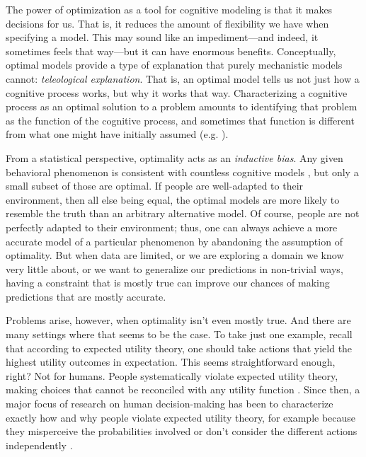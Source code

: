 The power of optimization as a tool for cognitive modeling is that it makes decisions for us. That is, it reduces the amount of flexibility we have when specifying a model. This may sound like an impediment---and indeed, it sometimes feels that way---but it can have enormous benefits. Conceptually, optimal models provide a type of explanation that purely mechanistic models cannot: \emph{teleological explanation}. That is, an optimal model tells us not just how a cognitive process works, but why it works that way. Characterizing a cognitive process as an optimal solution to a problem amounts to identifying that problem as the function of the cognitive process, and sometimes that function is different from what one might have initially assumed (e.g. \citealp{anderson1989human}).

From a statistical perspective, optimality acts as an \emph{inductive bias}. Any given behavioral phenomenon is consistent with countless cognitive models \citep{anderson1978arguments}, but only a small subset of those are optimal. If people are well-adapted to their environment, then all else being equal, the optimal models are more likely to resemble the truth than an arbitrary alternative model. Of course, people are not perfectly adapted to their environment; thus, one can always achieve a more accurate model of a particular phenomenon by abandoning the assumption of optimality. But when data are limited, or we are exploring a domain we know very little about, or we want to generalize our predictions in non-trivial ways, having a constraint that is mostly true can improve our chances of making predictions that are mostly accurate.

Problems arise, however, when optimality isn't even mostly true. And there are many settings where that seems to be the case. To take just one example, recall that according to expected utility theory, one should take actions that yield the highest utility outcomes in expectation. This seems straightforward enough, right? Not for humans. People systematically violate expected utility theory, making choices that cannot be reconciled with any utility function \citep{allais1953comportement,ellsberg1961risk,kahneman1979prospect}. Since then, a major focus of research on human decision-making has been to characterize exactly how and why people violate expected utility theory, for example because they misperceive the probabilities involved \citep{kahneman1979prospect} or don't consider the different actions independently \citep{roe2001multialternative}.

